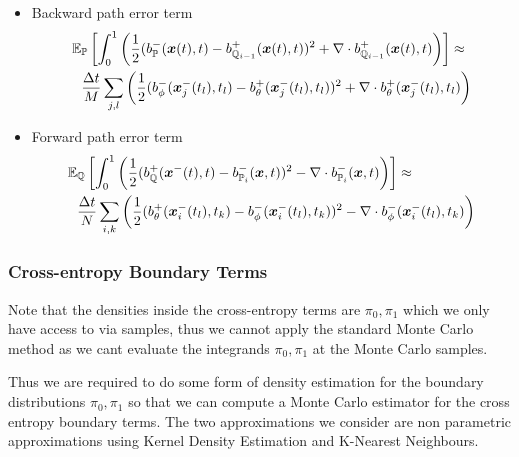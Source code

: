\documentclass[a4paper,12pt,twoside,openright]{report}
\theoremstyle{definition}
\begin{document}
\begin{itemize}
    \item Backward path error term 
\begin{align}
    \mathbb{E}&_{{\mathbb{P}}}\left[\int_0^1 \left(\frac{1}{2}(b_{\mathbb{P}}^{-}({\bm{x}}(t),t) - b_{{\mathbb{Q}}_{i-1}}^{+}({\bm{x}}(t),t))^2 + \nabla\cdot b^{+}_{{\mathbb{Q}}_{i-1}}({\bm{x}}(t),t) \right)\right] \approx \nonumber   \\
    &\frac{\Delta t}{M} \sum_{j,l}\left(\frac{1}{2}(b_\phi^{-}({\bm{x}}^{-}_j(t_l), t_l) - b_{\theta}^{+}({\bm{x}}^{-}_j(t_l), t_l))^2 + \nabla\cdot b^{+}_{\theta}({\bm{x}}^{-}_j(t_l), t_l)\right)
\end{align}
    \item Forward path error term
\begin{align}
    \mathbb{E}&_{{\mathbb{Q}}}\left[\int_0^1 \left(\frac{1}{2}(b_{\mathbb{Q}}^{+}({\bm{x}}^{-}(t), t) - b_{{\mathbb{P}}_{i}}^{-}({\bm{x}}, t))^2 - \nabla\cdot b^{-}_{{\mathbb{P}}_{i}}({\bm{x}}, t) \right)\right]  \approx \nonumber   \\
    &\frac{\Delta t}{N} \sum_{i,k}\left(\frac{1}{2}(b_\theta^{+}({\bm{x}}^{-}_i(t_l), t_k) - b_{\phi}^{-}({\bm{x}}^{-}_i(t_l), t_k))^2 - \nabla\cdot b^{-}_{\phi}({\bm{x}}^{-}_i(t_l), t_k)\right)
\end{align}
\end{itemize}
\subsubsection{Cross-entropy Boundary Terms}

Note that the densities inside the cross-entropy terms are $\pi_0, \pi_1$ which we only have access to via samples, thus we cannot apply the standard Monte Carlo  method as we cant evaluate the integrands $\pi_0, \pi_1$ at the Monte Carlo samples.

Thus we are required to do some form of density estimation for the boundary distributions $\pi_0, \pi_1$ so that we can compute a Monte Carlo  estimator for the cross entropy boundary terms. The two approximations we consider are non parametric approximations using Kernel Density Estimation and K-Nearest Neighbours.
\end{document}
